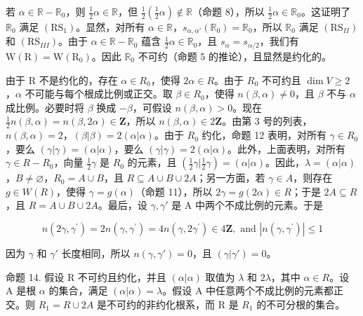 若 \(\alpha \in \mathbb{R} - \mathbb{R}_0\)，则 \(\frac{1}{2}\alpha \in \mathbb{R}\)，但 \(\frac{1}{2}\left(\frac{1}{2}\alpha\right) \notin \mathbb{R}\)（命题 8），所以 \(\frac{1}{2}\alpha \in \mathbb{R}_0\)。这证明了 \(\mathbb{R}_0\) 满足 \((\mathrm{RS}_1)\)。显然，对所有 \(\alpha \in \mathbb{R}\)，\(s_{\alpha, \alpha'}(\mathbb{R}_0) = \mathbb{R}_0\)，所以 \(\mathbb{R}_0\) 满足 \((\mathrm{RS}_{II})\) 和 \((\mathrm{RS}_{III})\)。由于 \(\alpha \in \mathbb{R} - \mathbb{R}_0\) 蕴含 \(\frac{1}{2}\alpha \in \mathbb{R}_0\)，且 \(s_\alpha = s_{\alpha/2}\)，我们有 \(\mathrm{W}(\mathrm{R}) = \mathrm{W}(\mathrm{R}_0)\)。因此 \(\mathbb{R}_0\) 不可约（命题 5 的推论），且显然是约化的。

由于 R 不是约化的，存在 \(\alpha\in R_{0}\)，使得 \(2\alpha\in R\)。由于 \(R_{0}\) 不可约且 \(\dim V\geqslant2\)，\(\alpha\) 不可能与每个根成比例或正交。取 \(\beta\in R_{0}\)，使得 \(n(\beta,\alpha)\neq0\)，且 \(\beta\) 不与 \(\alpha\) 成比例。必要时将 \(\beta\) 换成 \(-\beta\)，可假设 \(n(\beta,\alpha)>0\)。现在 \(\frac{1}{2}n(\beta,\alpha)=n(\beta,2\alpha)\in\mathbf{Z}\)，所以 \(n(\beta,\alpha)\in2\mathbf{Z}\)。由第 3 号的列表，\(n(\beta,\alpha)=2\)，\((\beta|\beta)=2(\alpha|\alpha)\)。由于 \(R_{0}\) 约化，命题 12 表明，对所有 \(\gamma\in R_{0}\)，要么 \((\gamma|\gamma)=(\alpha|\alpha)\)，要么 \((\gamma|\gamma)=2(\alpha|\alpha)\)。此外，上面表明，对所有 \(\gamma\in R-R_{0}\)，向量 \(\frac{1}{2}\gamma\) 是 \(R_{0}\) 的元素，且 \(\left(\frac{1}{2}\gamma|\frac{1}{2}\gamma\right)=(\alpha|\alpha)\)。因此，\(\lambda=(\alpha|\alpha)\)，\(B\neq\varnothing\)，\(R_{0}=A\cup B\)，且 \(R\subseteq A\cup B\cup2A\)；另一方面，若 \(\gamma\in A\)，则存在 \(g\in W(R)\)，使得 \(\gamma=g(\alpha)\)（命题 11），所以 \(2\gamma=g(2\alpha)\in R\)；于是 \(2A\subseteq R\)，且 \(R=A\cup B\cup2A\)。最后，设 \(\gamma,\gamma'\) 是 A 中两个不成比例的元素。于是

\[
n (2 \gamma , \gamma^ {\prime}) = 2 n (\gamma , \gamma^ {\prime}) = 4 n (\gamma , 2 \gamma^ {\prime}) \in 4 \mathbf {Z}, \text { and } | n (\gamma , \gamma^ {\prime}) | \leqslant 1
\]

因为 \(\gamma\) 和 \(\gamma'\) 长度相同，所以 \(n(\gamma, \gamma') = 0\)，且 \((\gamma|\gamma') = 0\)。

命题 14. 假设 R 不可约且约化，并且 \((\alpha|\alpha)\) 取值为 \(\lambda\) 和 \(2\lambda\)，其中 \(\alpha\in R\)。设 A 是根 \(\alpha\) 的集合，满足 \((\alpha|\alpha)=\lambda\)。假设 A 中任意两个不成比例的元素都正交。则 \(R_{1}=R\cup2A\) 是不可约的非约化根系，而 R 是 \(R_{1}\) 的不可分根的集合。

